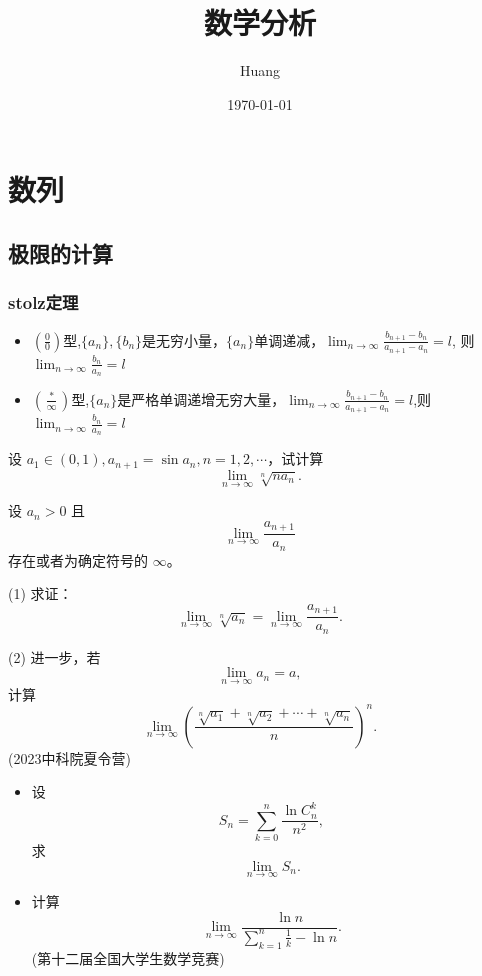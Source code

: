 \documentclass[lang=cn,10pt,thmcnt=section]{elegantbook}
\title{数学分析}
\author{Huang}
\date{\today}
\begin{document}
	
	\maketitle
	\frontmatter
	
	\tableofcontents
	
	\mainmatter
	\chapter{数列}
	\section{极限的计算}
	\subsection{stolz定理}
	\begin{theorem}[stolz]
		\begin{itemize}
			\item $(\frac{0}{0})$型,$\{ a_n\} ,\{ b_n\}$是无穷小量，$\{ a_n\}$单调递减，$\lim_{n \to \infty}  \frac{b_{n+1}-b_n}{a_{n+1}-a_n}=l$,	则$\lim_{n \to \infty}  \frac{b_n}{a_n}=l$
			\item $(\frac{*}{\infty})$型,$\{ a_n\} $是严格单调递增无穷大量，$\lim_{n \to \infty}  \frac{b_{n+1}-b_n}{a_{n+1}-a_n}=l$,则$\lim_{n \to \infty}  
			\frac{b_n}{a_n}=l$
		\end{itemize}
	\end{theorem}

	\begin{example}
		设 $a_1 \in (0,1), a_{n+1} = \sin a_n, n = 1,2,\cdots$，试计算  
\[ \lim_{n \to \infty} \sqrt[n]{n a_n}. \]
	\end{example}
	\begin{example}
		设 $a_n > 0$ 且  
\[ \lim_{n \to \infty} \frac{a_{n+1}}{a_n} \]  
存在或者为确定符号的 $\infty$。

(1) 求证：  
\[ \lim_{n \to \infty} \sqrt[n]{a_n} = \lim_{n \to \infty} \frac{a_{n+1}}{a_n}. \]

(2) 进一步，若  
\[ \lim_{n \to \infty} a_n = a, \]  
计算  
\[ \lim_{n \to \infty} \left( \frac{\sqrt[n]{a_1} + \sqrt[n]{a_2} + \cdots + \sqrt[n]{a_n}}{n} \right)^n. \]  
(2023中科院夏令营)
	\end{example}
\begin{example}
	\begin{itemize}
		\item 设  
		\[ S_n = \sum_{k=0}^n \frac{\ln C_n^k}{n^2}, \]  
		求  
		\[ \lim_{n \to \infty} S_n. \]
		
		\item 计算  
		\[ \lim_{n \to \infty} \frac{\ln n}{\sum_{k=1}^n \frac{1}{k} - \ln n}. \]  
		(第十二届全国大学生数学竞赛)
	\end{itemize}
\end{example}
\end{document}
